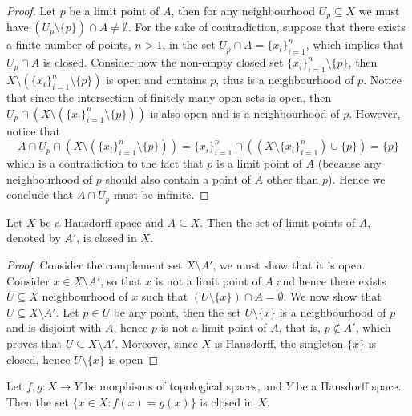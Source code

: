 \begin{proof}
Let \(p\) be a limit point of \(A\), then for any neighbourhood \(U_p
\subseteq X\) we must have \((U_p \setminus \{p\}) \cap A \neq \emptyset\).
For the sake of contradiction, suppose that there exists a finite number of
points, \(n > 1\), in the set \(U_p \cap A = \{x_i\}_{i=1}^n\), which implies
that \(U_p \cap A\) is closed. Consider now the non-empty closed set
\(\{x_i\}_{i=1}^n \setminus \{p\}\), then \(X \setminus (\{x_i\}_{i=1}^n
\setminus \{p\})\) is open and contains \(p\), thus is a neighbourhood of
\(p\). Notice that since the intersection of finitely many open sets is open,
then \(U_p \cap \left( X \setminus \left( \{x_i\}_{i=1}^n \setminus \{p\}
\right) \right)\) is also open and is a neighbourhood of \(p\). However, notice
that
\[
  A \cap U_p \cap (X \setminus (\{x_i\}_{i=1}^n \setminus \{p\}))
  = \{x_i\}_{i=1}^n \cap ((X \setminus \{x_i\}_{i=1}^n) \cup \{p\})
  = \{p\}
\]
which is a contradiction to the fact that \(p\) is a limit point of \(A\)
(because any neighbourhood of \(p\) should also contain a point of \(A\) other
than \(p\)). Hence we conclude that \(A \cap U_p\) must be infinite.
\end{proof}

\begin{proposition}
Let \(X\) be a Hausdorff space and \(A \subseteq X\). Then the set of limit
points of \(A\), denoted by \(A'\), is closed in \(X\).
\end{proposition}

\begin{proof}
Consider the complement set \(X \setminus A'\), we must show that it is open.
Consider \(x \in X \setminus A'\), so that \(x\) is not a limit point of \(A\)
and hence there exists \(U \subseteq X\) neighbourhood of \(x\) such that \((U
\setminus \{x\}) \cap A = \emptyset\). We now show that \(U \subseteq X
\setminus A'\). Let \(p \in U\) be any point, then the set \(U \setminus
\{x\}\) is a neighbourhood of \(p\) and is disjoint with \(A\), hence \(p\) is
not a limit point of \(A\), that is, \(p \not\in A'\), which proves that \(U
\subseteq X \setminus A'\). Moreover, since \(X\) is Hausdorff, the singleton
\(\{x\}\) is closed, hence \(U \setminus \{x\}\) is open
\end{proof}

\begin{proposition}
Let \(f,g : X \to Y\) be morphisms of topological spaces, and \(Y\) be a
Hausdorff space. Then the set \(\{x \in X \colon f(x) = g(x)\}\) is closed in
\(X\).
\end{proposition}

